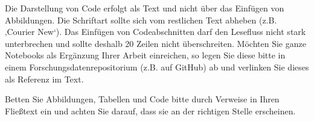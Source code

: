 Die Darstellung von Code erfolgt als Text und nicht über das Einfügen von Abbildungen. Die Schriftart sollte sich vom restlichen Text abheben (z.B. ‚Courier New‘). Das Einfügen von Codeabschnitten darf den Lesefluss nicht stark unterbrechen und sollte deshalb 20 Zeilen nicht überschreiten. Möchten Sie ganze Notebooks als Ergänzung Ihrer Arbeit einreichen, so legen Sie diese bitte in einem Forschungsdatenrepositorium (z.B. auf GitHub) ab und verlinken Sie dieses als Referenz im Text. 

Betten Sie Abbildungen, Tabellen und Code bitte durch Verweise in Ihren Fließtext ein und achten Sie darauf, dass sie an der richtigen Stelle erscheinen.